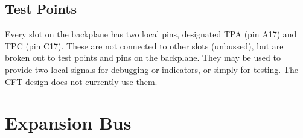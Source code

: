 \documentclass[11pt,a4paper,twocolumns]{article}
\newcommand{\ps}[1]{\textsf{#1}}
\newcommand\TPA{\ps{TPA}}
\newcommand\TPC{\ps{TPC}}
\begin{document}
\subsection{Test Points}

Every slot on the backplane has two local pins, designated \TPA{} (pin
A17) and \TPC{} (pin C17). These are not connected to other slots
(unbussed), but are broken out to test points and pins on the
backplane. They may be used to provide two local signals for debugging
or indicators, or simply for testing. The CFT design does not
currently use them.

\section{Expansion Bus}
\label{sec-expansion}
\end{document}
